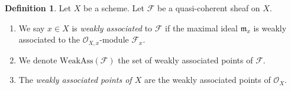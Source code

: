 \documentclass[10pt,a4paper]{amsart}
\theoremstyle{plain}
\theoremstyle{definition}
\newtheorem{definition}[subsection]{Definition}
\theoremstyle{remark}
\numberwithin{equation}{subsection}
\begin{document}
\begin{definition}
\label{definition-weakly-associated}
Let $X$ be a scheme.
Let $\mathcal{F}$ be a quasi-coherent sheaf on $X$.
\begin{enumerate}
\item We say $x \in X$ is {\it weakly associated} to $\mathcal{F}$
if the maximal ideal $\mathfrak m_x$ is weakly associated to the
$\mathcal{O}_{X, x}$-module $\mathcal{F}_x$.
\item We denote $\text{WeakAss}(\mathcal{F})$ the set of weakly associated
points of $\mathcal{F}$.
\item The {\it weakly associated points of $X$} are the weakly associated
points of $\mathcal{O}_X$.
\end{enumerate}
\end{definition}
\end{document}
